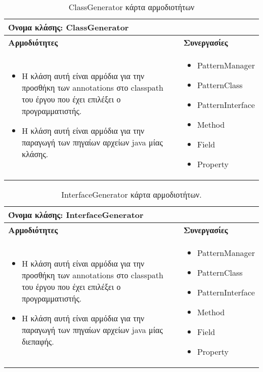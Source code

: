 \begin{table}[H]
    \centering
    \begin{tabular}{|p{5cm}|p{5cm}|}
        \hline
        \multicolumn{2}{|l|}{Όνομα κλάσης: ClassGenerator} \\
        \hline
        \textbf{Αρμοδιότητες} & \textbf{Συνεργασίες} \\
        \hline
        \begin{itemize}
            \item Η κλάση αυτή είναι αρμόδια για την προσθήκη των annotations στο classpath του έργου που έχει επιλέξει ο προγραμματιστής.
            \item Η κλάση αυτή είναι αρμόδια για την παραγωγή των πηγαίων αρχείων java μίας κλάσης.
        \end{itemize} &   
        \begin{itemize}
            \item PatternManager
            \item PatternClass
            \item PatternInterface
            \item Method
            \item Field
            \item Property
        \end{itemize} \\
        \hline
    \end{tabular}
    \label{tab:ClassGeneratorCRC}
    \caption{ClassGenerator κάρτα αρμοδιοτήτων}
\end{table}
\begin{table}[H]
    \centering
    \begin{tabular}{|p{5cm}|p{5cm}|}
        \hline
        \multicolumn{2}{|l|}{Όνομα κλάσης: InterfaceGenerator} \\
        \hline
        \textbf{Αρμοδιότητες} & \textbf{Συνεργασίες} \\
        \hline
        \begin{itemize}
            \item Η κλάση αυτή είναι αρμόδια για την προσθήκη των annotations στο classpath του έργου που έχει επιλέξει ο προγραμματιστής.
            \item Η κλάση αυτή είναι αρμόδια για την παραγωγή των πηγαίων αρχείων java μίας διεπαφής.
        \end{itemize} &   
        \begin{itemize}
            \item PatternManager
            \item PatternClass
            \item PatternInterface
            \item Method
            \item Field
            \item Property
        \end{itemize} \\
        \hline
    \end{tabular}
    \caption{InterfaceGenerator κάρτα αρμοδιοτήτων.}
    \label{tab:InterfaceGeneratorCRC}
\end{table}